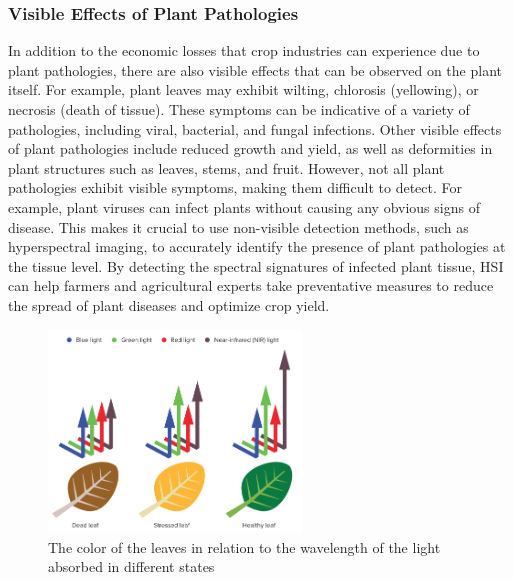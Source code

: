 \documentclass{article}
\begin{document}
{                \subsubsection{Visible Effects of Plant Pathologies}
                \hspace{0.5cm}In addition to the economic losses that crop industries can experience due to plant pathologies, there are also visible effects that can be observed on the plant itself. For example, plant leaves may exhibit wilting, chlorosis (yellowing), or necrosis (death of tissue). These symptoms can be indicative of a variety of pathologies, including viral, bacterial, and fungal infections. Other visible effects of plant pathologies include reduced growth and yield, as well as deformities in plant structures such as leaves, stems, and fruit. However, not all plant pathologies exhibit visible symptoms, making them difficult to detect. For example, plant viruses can infect plants without causing any obvious signs of disease. This makes it crucial to use non-visible detection methods, such as hyperspectral imaging, to accurately identify the presence of plant pathologies at the tissue level. By detecting the spectral signatures of infected plant tissue, HSI can help farmers and agricultural experts take preventative measures to reduce the spread of plant diseases and optimize crop yield.\par
                \vspace*{1\baselineskip}
                
                 \begin{figure}[h]
                    \centering
                    \includegraphics[width=0.6\textwidth]{Figures/leafVis.PNG}
                    \caption{ The color of the leaves in relation to the wavelength of the light absorbed in different states}
                    \label{fig:my_label}
                \end{figure}
                \newpage
                
}
\end{document}
